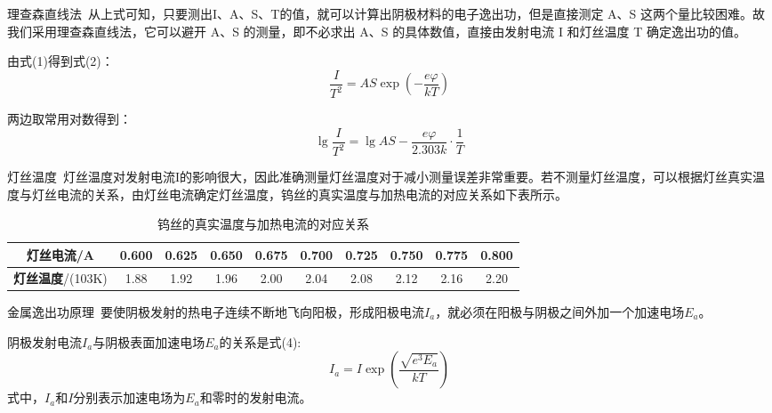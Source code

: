 \documentclass{beamer}
\begin{document}
    \begin{frame}{理查森直线法}{\thesubsection \, \subsecname}
        从上式可知，只要测出I、A、S、T的值，就可以计算出阴极材料的电子逸出功，但是直接测定 A、S 这两个量比较困难。故我们采用理查森直线法，它可以避开 A、S 的测量，即不必求出 A、S 的具体数值，直接由发射电流 I 和灯丝温度 T 确定逸出功的值。

        由式(1)得到式(2)：
        \begin{equation}
            \frac{I}{T^2} = AS\exp(-\frac{e\varphi}{kT})
        \end{equation}

        两边取常用对数得到：
        \begin{equation}
            \lg\frac{I}{T^2} = \lg AS - \frac{e\varphi}{2.303k}\cdot \frac{1}{T}
        \end{equation}
    \end{frame}

    \begin{frame}{灯丝温度}{\thesubsection \, \subsecname}
        灯丝温度对发射电流I的影响很大，因此准确测量灯丝温度对于减小测量误差非常重要。若不测量灯丝温度，可以根据灯丝真实温度与灯丝电流的关系，由灯丝电流确定灯丝温度，钨丝的真实温度与加热电流的对应关系如下表所示。
        \begin{table}
            \footnotesize
            \caption{钨丝的真实温度与加热电流的对应关系}
            \centering
            \begin{tabular}{cccccccccc}
            \toprule
            \textbf{灯丝电流}/A & 0.600	& 0.625	& 0.650	& 0.675	& 0.700	& 0.725	& 0.750	& 0.775	& 0.800\\
            \midrule
            \textbf{灯丝温度}/(103K) & 1.88	& 1.92	& 1.96	& 2.00	& 2.04	& 2.08	& 2.12	& 2.16	& 2.20\\
            \bottomrule
            \end{tabular}
        \end{table}
    \end{frame}

    \begin{frame}{金属逸出功原理}{\thesubsection \, \subsecname}
        要使阴极发射的热电子连续不断地飞向阳极，形成阳极电流$I_a$，就必须在阳极与阴极之间外加一个加速电场$E_a$。

        阴极发射电流$I_a$与阴极表面加速电场$E_a$的关系是式(4):
        \begin{equation}
            I_a = I \exp(\frac{\sqrt{e^3E_a}}{kT})
        \end{equation}
        式中，$I_a$和$I$分别表示加速电场为$E_a$和零时的发射电流。
    \end{frame}
\end{document}
